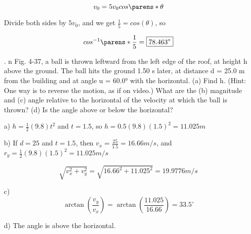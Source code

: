 \documentclass{scrreprt} %
\begin{document}
$$v_0 = 5v_0cos\parens*{\theta}$$

Divide both sides by $5v_0$, and we get $\frac{1}{5}=cos(\theta)$, so

$$cos^{-1}\parens*{\frac{1}{5}} = \boxed{78.463^\circ}$$






. n Fig. 4-37, a ball is thrown leftward from the left edge of the
roof, at  height  h above  the  ground. The  ball  hits  the  ground  1.50 s
later, at distance d = 25.0 m from the building and at angle u = 60.0°
with  the  horizontal. (a)  Find  h.
(Hint: One way is to reverse the
motion, as  if  on  video.)  What
are  the  (b)  magnitude  and  (c)
angle  relative  to  the  horizontal
of the velocity at which the ball
is thrown? (d) Is the angle
above or below the horizontal? \newline


a) $h=\frac{1}{2}(9.8)t^2$ and $t = 1.5$, so $h = \boxed{0.5(9.8)(1.5)^2 = 11.025 m}$

b) If $d=25$ and $t=1.5$, then $v_x = \frac{25}{1.5} = 16.66 m/s$, and $r_y = \frac{1}{2}(9.8)(1.5)^2 = 11.025 m/s$

$$\sqrt{v_x^2 + v_y^2} = \sqrt{16.66^2 + 11.025^2} = \boxed{19.9776 m/s}$$

c) $$\arctan (\frac{v_y}{v_x}) = \arctan (\frac{11.025}{16.66}) = \boxed{33.5^\circ}$$

d) The angle is above the horizontal.
\end{document}
